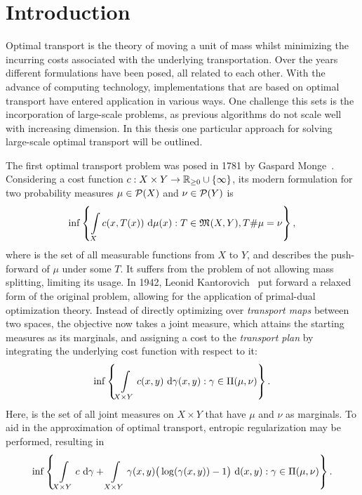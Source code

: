 \chapter*{Introduction}

Optimal transport is the theory of moving a unit of mass whilst minimizing the incurring costs associated with the underlying transportation. Over the years different formulations have been posed, all related to each other. With the advance of computing technology, implementations that are based on optimal transport have entered application in various ways. One challenge this sets is the incorporation of large-scale problems, as previous algorithms do not scale well with increasing dimension. In this thesis one particular approach for solving large-scale optimal transport will be outlined.

The first optimal transport problem was posed in 1781 by Gaspard Monge\ \cite{Mon1781}. Considering a cost function $\map[c]{X \times Y}{\RZero \cup \{ \infty \}}$, its modern formulation for two probability measures $\mu \in \PM{X}$ and $\nu \in \PM{Y}$ is
\[ \inf \left\{ \int\limits_X c(x, T(x))~\Dx{\mu} : T \in \MF{X}{Y}, \push{\mu} = \nu \right\}, \]
where  is the set of all measurable functions from $X$ to $Y$, and \push{\mu} describes the push-forward of $\mu$ under some $T$.
It suffers from the problem of not allowing mass splitting, limiting its usage. In 1942, Leonid Kantorovich\ \cite{Kan1942} put forward a relaxed form of the original problem, allowing for the application of primal-dual optimization theory. Instead of directly optimizing over \textit{transport maps} between two spaces, the objective now takes a joint measure, which attains the starting measures as its marginals, and assigning a cost to the \textit{transport plan} by integrating the underlying cost function with respect to it:
\[ \inf \left\{ \int\limits_{X \times Y} c(x, y)~\Dx[x, y]{\gamma} : \gamma \in \TP{\mu}{\nu} \right\}. \]
Here, \TP{\mu}{\nu} is the set of all joint measures on $X \times Y$ that have $\mu$ and $\nu$ as marginals. To aid in the approximation of optimal transport, entropic regularization may be performed, resulting in
\[ \inf \left\{ \int\limits_{X \times Y} c~\D[\gamma] + \int\limits_{X \times Y} \gamma(x, y) \big( \log(\gamma(x, y)) - 1 \big)~\D[(x, y)] : \gamma \in \TP{\mu}{\nu} \right\}. \]

